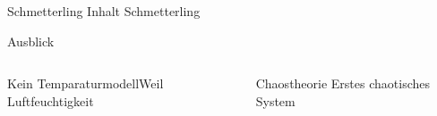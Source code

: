 \documentclass[presentation.tex]{subfiles}
\begin{document}
	\begin{frame}{Schmetterling}
		Inhalt Schmetterling
	\end{frame}
	\begin{frame}{Ausblick}
		\begin{columns}[T]
			\begin{column}{.5\textwidth}
				\begin{block}{Kein Temparaturmodell}{Weil}
					Luftfeuchtigkeit
				\end{block}
			\end{column}
			\begin{column}{.5\textwidth}
				\begin{block}{Chaostheorie}
					Erstes chaotisches System
				\end{block}
			\end{column}
		\end{columns}
	\end{frame}
\end{document}
